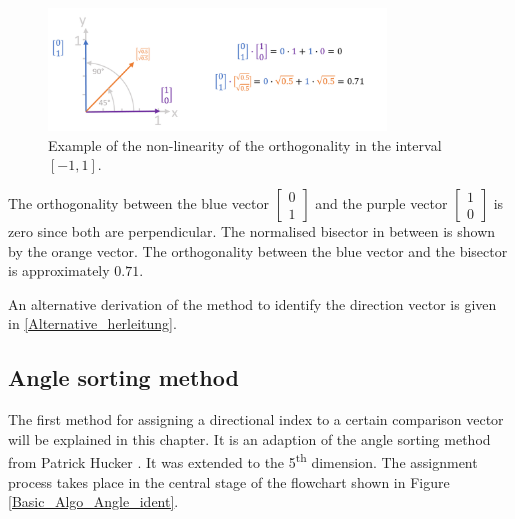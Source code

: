 \begin{figure}[H]
    \centering
    \includegraphics[width=0.8\textwidth]{Graphics/orthogonality2.png}
    \caption{Example of the non-linearity of the orthogonality in the interval $[-1,1]$. }
    \label{orthogonaltiy_figure2}
\end{figure}

The orthogonality between the blue vector $\begin{bmatrix} 0 \\ 1 \end{bmatrix}$ and the purple vector $\begin{bmatrix} 1 \\ 0 \end{bmatrix}$ is zero since both are perpendicular. The normalised bisector in between is shown by the orange vector.
The orthogonality between the blue vector and the bisector is approximately $0.71$.

\medskip

An alternative derivation of the method to identify the direction vector is given in \ref{Alternative_herleitung}.

\newpage


\subsection{Angle sorting method}
\label{chap:angle_sorting}
The first method for assigning a directional index to a certain comparison vector will be explained in this chapter. It is an adaption of the angle sorting method from Patrick Hucker \cite{PatrickHucker2014EvaluationRuckstreumodells}. It was extended to the 5\textsuperscript{th} dimension. The assignment process takes place in the central stage of the flowchart shown in Figure \ref{Basic_Algo_Angle_ident}. 




